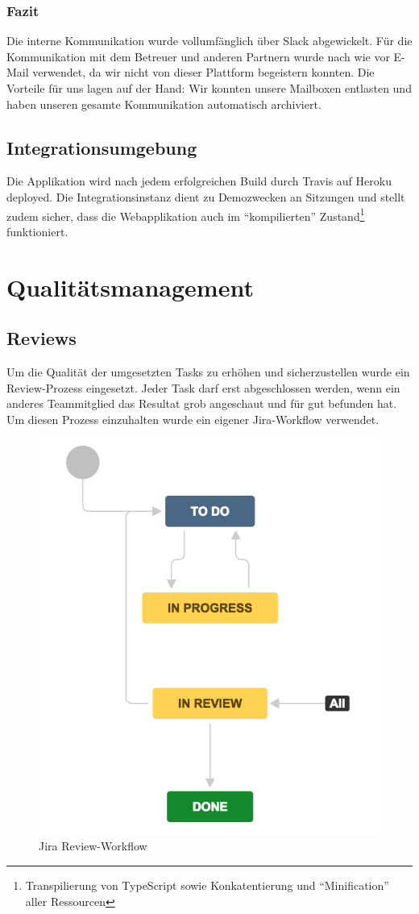 \subsection{Fazit}
Die interne Kommunikation wurde vollumfänglich über Slack abgewickelt. Für die Kommunikation mit dem Betreuer und anderen Partnern wurde nach wie vor E-Mail verwendet, da wir \proff nicht von dieser Plattform begeistern konnten.
Die Vorteile für uns lagen auf der Hand: Wir konnten unsere Mailboxen entlasten und haben unseren gesamte Kommunikation automatisch archiviert.

\section{Integrationsumgebung}
Die Applikation wird nach jedem erfolgreichen Build durch Travis auf Heroku deployed. Die Integrationsinstanz dient zu Demozwecken an Sitzungen und stellt zudem sicher, dass die Webapplikation auch im ``kompilierten'' Zustand\footnote{Transpilierung von TypeScript sowie Konkatentierung und ``Minification'' aller Ressourcen} funktioniert.


\chapter{Qualitätsmanagement}

\section{Reviews}

Um die Qualität der umgesetzten Tasks zu erhöhen und sicherzustellen wurde ein Review-Prozess eingesetzt. Jeder Task darf erst abgeschlossen werden, wenn ein anderes Teammitglied das Resultat grob angeschaut und für gut befunden hat. Um diesen Prozess einzuhalten wurde ein eigener Jira-Workflow verwendet.

\begin{figure}
\centering
\includegraphics[width=0.7\linewidth]{fig/jira-workflow}
\caption{Jira Review-Workflow}
\label{fig:jira-workflow}
\end{figure}


